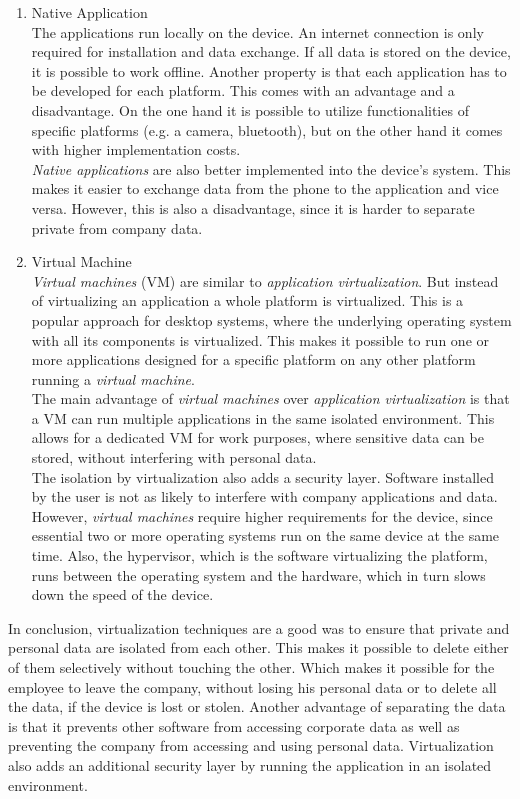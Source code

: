 \begin{enumerate}
	\item Native Application \\
	The applications run locally on the device. An internet connection is only required for installation and data exchange. If all data is stored on the device, it is possible to work offline. Another property is that each application has to be developed for each platform. This comes with an advantage and a disadvantage. On the one hand it is possible to utilize functionalities of specific platforms (e.g. a camera, bluetooth), but on the other hand it comes with higher implementation costs. \\
	\textit{Native applications} are also better implemented into the device's system. This makes it easier to exchange data from the phone to the application and vice versa. However, this is also a disadvantage, since it is harder to separate private from company data. \parencite{Disterer.2013}
	\item Virtual Machine \\
	\textit{Virtual machines} (VM) are similar to \textit{application virtualization}. But instead of virtualizing an application a whole platform is virtualized. This is a popular approach for desktop systems, where the underlying operating system with all its components is virtualized. This makes it possible to run one or more applications designed for a specific platform on any other platform running a \textit{virtual machine}. \\
	The main advantage of \textit{virtual machines} over \textit{application virtualization} is that a VM can run multiple applications in the same isolated environment. This allows for a dedicated VM for work purposes, where sensitive data can be stored, without interfering with personal data. \\
	The isolation by virtualization also adds a security layer. Software installed by the user is not as likely to interfere with company applications and data. However, \textit{virtual machines} require higher requirements for the device, since essential two or more operating systems run on the same device at the same time. Also, the hypervisor, which is the software virtualizing the platform, runs between the  operating system and the hardware, which in turn slows down the speed of the device. \parencite{Disterer.2013}
\end{enumerate}
In conclusion, virtualization techniques are a good was to ensure that private and personal data are isolated from each other. This makes it possible to delete either of them selectively without touching the other. Which makes it possible for the employee to leave the company, without losing his personal data or to delete all the data, if the device is lost or stolen. Another advantage of separating the data is that it prevents other software from accessing corporate data as well as preventing the company from accessing and using personal data. Virtualization also adds an additional security layer by running the application in an isolated environment. \\
